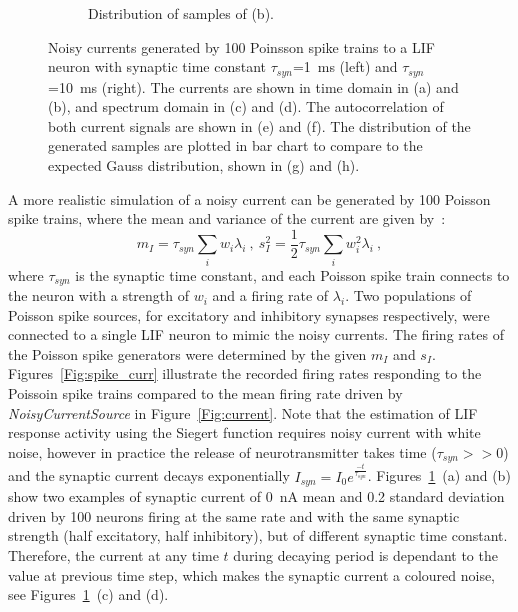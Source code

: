 \begin{figure}[tbp!]
\begin{subfigure}[t]{0.43\textwidth}
			\caption{Distribution of samples of (b).}
		\end{subfigure}
		\caption{Noisy currents generated by 100 Poinsson spike trains to a LIF neuron with synaptic time constant $\tau_{syn}$=1~ms (left) and $\tau_{syn}$=10~ms (right). The currents are shown in time domain in (a) and (b), and spectrum domain in (c) and (d). The autocorrelation of both current signals are shown in (e) and (f). The distribution of the generated samples are plotted in bar chart to compare to the expected Gauss distribution, shown in (g) and (h).}
		\label{Fig:lif_pois}
	\end{figure}

	A more realistic simulation of a noisy current can be generated by 100 Poisson spike trains, 
	where the mean and variance of the current are given by~\citep{la2008response}:
	\begin{equation}
	m_I = \tau_{syn}\sum_i w_i\lambda_{i}~, ~s_I^2=\frac{1}{2}\tau_{syn}\sum_i w_i^2\lambda_{i}~,
	\label{equ:distr0}
	\end{equation}
	where $\tau_{syn}$ is the synaptic time constant, and each Poisson spike train connects to the neuron with a strength of $w_i$ and a firing rate of $\lambda_i$.
	Two populations of Poisson spike sources, for excitatory and inhibitory synapses respectively, were connected to a single LIF neuron to mimic the noisy currents.
	The firing rates of the Poisson spike generators were determined by the given $m_I$ and $s_I$.
	Figures~\ref{Fig:spike_curr} illustrate the recorded firing rates responding to the Poissoin spike trains compared to the mean firing rate driven by \textit{NoisyCurrentSource} in Figure~\ref{Fig:current}.
	Note that the estimation of LIF response activity using the Siegert function requires noisy current with white noise, however
	in practice the release of neurotransmitter takes time ($\tau_{syn} >> 0$) and the synaptic current decays exponentially $I_{syn} = I_0 e^{\frac{-t}{\tau_{syn}}}$.
	Figures~\ref{Fig:lif_pois}~(a) and (b) show two examples of synaptic current of 0~nA mean and 0.2 standard deviation driven by 100 neurons firing at the same rate and with the same synaptic strength (half excitatory, half inhibitory), but of different synaptic time constant.
	Therefore, the current at any time $t$ during decaying period is dependant to the value at previous time step, which makes the synaptic current a coloured noise, see Figures~\ref{Fig:lif_pois}~(c) and (d).
	
